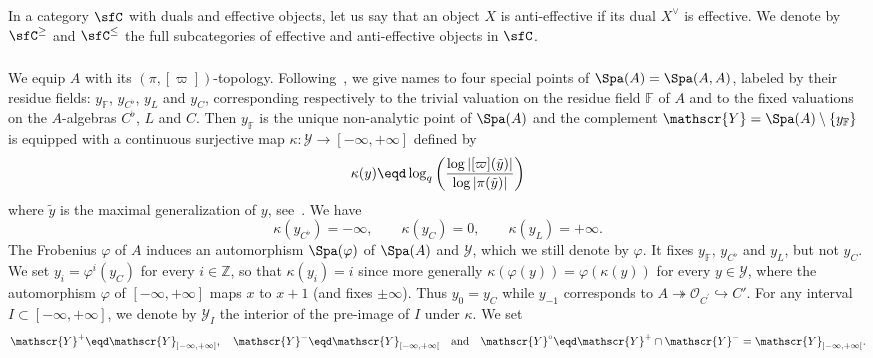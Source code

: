 \subsubsection{}

In a category $\sfC$ with duals and effective objects, let us say that an object $X$ is anti-effective if its dual $X^{\vee}$ is effective. We denote by $\sfC^{\geq}$ and $\sfC^{\leq}$ the full subcategories of effective and anti-effective objects in $\sfC$.

\subsubsection{}

We equip $A$ with its $(\pi,[\varpi])$-topology. Following~\cite[12.2]{ScWe15}, we give names to four special points of $\Spa(A)=\Spa(A,A)$, labeled by their residue fields: $y_{\mathbb{F}}$, $y_{C^{\flat}}$, $y_{L}$ and $y_{C}$, corresponding respectively to the trivial valuation on the residue field $\mathbb{F}$ of $A$ and to the fixed valuations on the $A$-algebras $C^{\flat}$, $L$ and $C$. Then $y_{\mathbb{F}}$ is the unique non-analytic point of $\Spa(A)$ and the complement $\mathscr{Y}=\Spa(A)\setminus\{y_{\mathbb{F}}\}$ is equipped with a continuous surjective map $\kappa:\mathscr{Y}\rightarrow[-\infty,+\infty]$ defined by
\[
\kappa(y)\eqd\log_{q}\left(\frac{\log\left|[\varpi](\tilde{y})\right|}{\log\left|\pi(\tilde{y})\right|}\right)
\]
where $\tilde{y}$ is the maximal generalization of $y$, see~\cite[12.2]{ScWe15}. We have
\[
\kappa(y_{C^{\flat}})=-\infty,\qquad\kappa(y_{C})=0,\qquad\kappa(y_{L})=+\infty.
\]
The Frobenius $\varphi$ of $A$ induces an automorphism $\Spa(\varphi)$ of $\Spa(A)$ and $\mathscr{Y}$, which we still denote by $\varphi$. It fixes $y_{\mathbb{F}}$, $y_{C^{\flat}}$ and $y_{L}$, but not $y_{C}$. We set $y_{i}=\varphi^{i}(y_{C})$ for every $i\in\mathbb{Z}$, so that $\kappa(y_{i})=i$ since more generally $\kappa(\varphi(y))=\varphi(\kappa(y))$ for every $y\in\mathscr{Y}$, where the automorphism $\varphi$ of $[-\infty,+\infty]$ maps $x$ to $x+1$ (and fixes $\pm\infty$). Thus $y_{0}=y_{C}$ while $y_{-1}$ corresponds to $A\twoheadrightarrow\mathcal{O}_{C^{\prime}}\hookrightarrow C'$. For any interval $I\subset[-\infty,+\infty]$, we denote by $\mathscr{Y}_{I}$ the interior of the pre-image of $I$ under $\kappa$. We set
\[
\mathscr{Y}^{+}\eqd\mathscr{Y}_{]-\infty,+\infty]},\quad\mathscr{Y}^{-}\eqd\mathscr{Y}_{[-\infty,+\infty[}\quad\text{and}\quad\mathscr{Y}^{\circ}\eqd\mathscr{Y}^{+}\cap\mathscr{Y}^{-}=\mathscr{Y}_{]-\infty,+\infty[}.
\]

